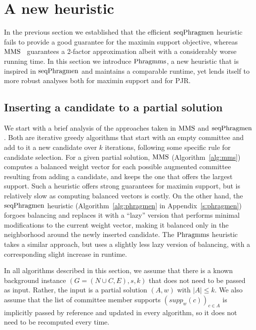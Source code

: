 \section{A new heuristic}\label{s:heuristic}

In the previous section we established that the efficient $\operatorname{seqPhragmen}$ heuristic~\cite{brill2017phragmen} fails to provide a good guarantee for the maximin support objective, whereas $\operatorname{MMS}$~\cite{sanchez2016maximin} guarantees a 2-factor approximation albeit with a considerably worse running time. 
In this section we introduce $\operatorname{Phragmms}$, a new heuristic that is inspired in $\operatorname{seqPhragmen}$ and maintains a comparable runtime, yet lends itself to more robust analyses both for maximin support and for PJR. 

\subsection{Inserting a candidate to a partial solution}

We start with a brief analysis of the approaches taken in $\operatorname{MMS}$ and $\operatorname{seqPhragmen}$. Both are iterative greedy algorithms that start with an empty committee and add to it a new candidate over $k$ iterations, following some specific rule for candidate selection.
For a given partial solution, $\operatorname{MMS}$ (Algorithm~\ref{alg:mms}) computes a balanced weight vector for each possible augmented committee resulting from adding a candidate, and keeps the one that offers the largest support. 
Such a heuristic offers strong guarantees for maximin support, but is relatively slow as computing balanced vectors is costly. 
On the other hand, the $\operatorname{seqPhragmen}$ heuristic (Algorithm~\ref{alg:phragmen} in Appendix~\ref{s:phragmen}) forgoes balancing and replaces it with a ``lazy'' version that performs minimal modifications to the current weight vector, making it balanced only in the neighborhood around the newly inserted candidate. 
The $\operatorname{Phragmms}$ heuristic takes a similar approach, but uses a slightly less lazy version of balancing, with a corresponding slight increase in runtime. 

In all algorithms described in this section, we assume that there is a known background instance $(G=(N\cup C, E), s, k)$ that does not need to be passed as input. Rather, the input is a partial solution $(A,w)$ with $|A|\leq k$. We also assume that the list of committee member supports $(supp_w(c))_{c\in A}$ is implicitly passed by reference and updated in every algorithm, so it does not need to be recomputed every time.

